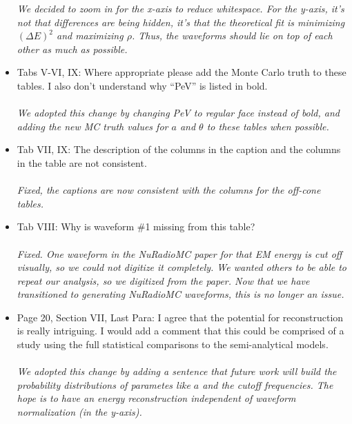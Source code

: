 \documentclass[12pt]{article}
\begin{document}
\begin{itemize}
\textit{We decided to zoom in for the x-axis to reduce whitespace.  For the y-axis, it's not that differences are being hidden, it's that the theoretical fit is minimizing $(\Delta E)^2$ and maximizing $\rho$.  Thus, the waveforms should lie on top of each other as much as possible.}
\item Tabs V-VI, IX: Where appropriate please add the Monte Carlo truth to these tables. I also don’t understand why ``PeV'' is listed in bold. \\ \\
\textit{We adopted this change by changing PeV to regular face instead of bold, and adding the new MC truth values for $a$ and $\theta$ to these tables when possible.}
\item Tab VII, IX: The description of the columns in the caption and the columns in the table are not consistent. \\ \\
\textit{Fixed, the captions are now consistent with the columns for the off-cone tables.}
\item Tab VIII: Why is waveform \#1 missing from this table? \\ \\
\textit{Fixed.  One waveform in the NuRadioMC paper for that EM energy is cut off visually, so we could not digitize it completely.  We wanted others to be able to repeat our analysis, so we digitized from the paper.  Now that we have transitioned to generating NuRadioMC waveforms, this is no longer an issue.}
\item Page 20, Section VII, Last Para: I agree that the potential for reconstruction is really intriguing. I would add a comment that this could be comprised of a study using the full statistical comparisons to the semi-analytical models. \\ \\
\textit{We adopted this change by adding a sentence that future work will build the probability distributions of parametes like $a$ and the cutoff frequencies.  The hope is to have an energy reconstruction independent of waveform normalization (in the y-axis).}
\end{itemize}
\end{document}
